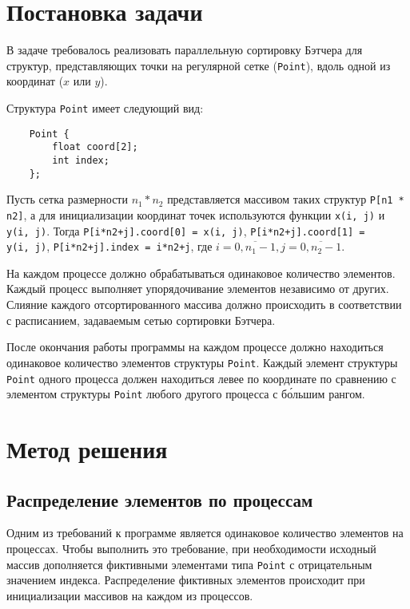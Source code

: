 \documentclass[oneside,final,14pt]{extreport}
\begin{document}
\chapter*{Постановка задачи}

В задаче требовалось реализовать параллельную сортировку Бэтчера для структур,
представляющих точки на регулярной сетке (\texttt{Point}), вдоль одной из
координат ($x$ или $y$).

Структура \texttt{Point} имеет следующий вид:
\begin{verbatim}
    Point {
        float coord[2];
        int index;
    };
\end{verbatim}

Пусть сетка размерности $n_1 * n_2$ представляется массивом таких структур
\texttt{P[n1 * n2]}, а для инициализации координат точек используются функции
\texttt{x(i,~j)} и \texttt{y(i,~j)}.
Тогда \texttt{P[i*n2+j].coord[0] = x(i,~j)},
\texttt{P[i*n2+j].coord[1] = y(i,~j)}, \texttt{P[i*n2+j].index = i*n2+j}, где $i = \overline{0, n_1-1},
j = \overline{0,n_2-1}$.

На каждом процессе должно обрабатываться одинаковое количество элементов.
Каждый процесс выполняет упорядочивание элементов независимо от других.
Слияние каждого отсортированного массива должно происходить в соответствии с
расписанием, задаваемым сетью сортировки Бэтчера.

После окончания работы программы на каждом процессе должно находиться одинаковое
количество элементов структуры \texttt{Point}. Каждый элемент структуры
\texttt{Point} одного процесса должен находиться левее по координате
по сравнению с элементом структуры \texttt{Point} любого другого процесса с
б\'{о}льшим рангом.

\chapter*{Метод решения}

\section*{Распределение элементов по процессам}

Одним из требований к программе является одинаковое количество элементов
на процессах. Чтобы выполнить это требование, при необходимости
исходный массив дополняется фиктивными элементами типа \texttt{Point} с
отрицательным значением индекса. Распределение фиктивных элементов происходит
при инициализации массивов на каждом из процессов.
\end{document}
